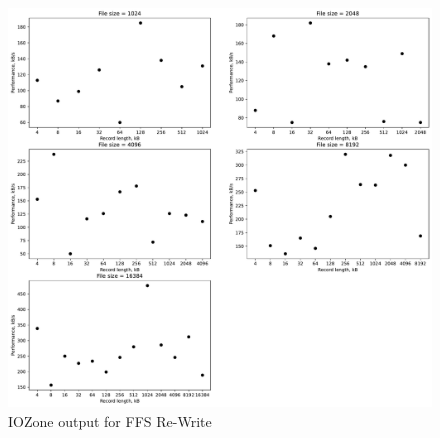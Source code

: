 \begin{figure}[!htb]
	\label{fig:app_bench_ffs_rnd_read}
	\begin{center}
		\includegraphics[width=1.0\textwidth]{figures/benchmarking/ffs/Re-Writer.pdf}
	\end{center}
	\caption{IOZone output for FFS Re-Write}
\end{figure}